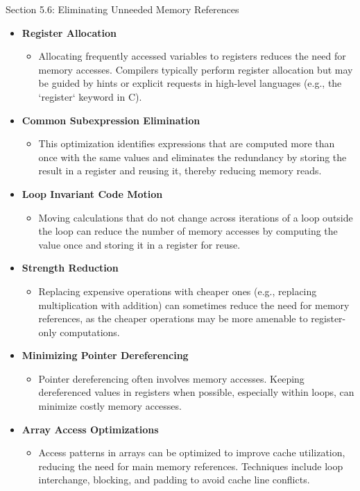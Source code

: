 \begin{notes}{Section 5.6: Eliminating Unneeded Memory References}
    \begin{itemize}
        \item \textbf{Register Allocation}
        \begin{itemize}
            \item Allocating frequently accessed variables to registers reduces the need for memory accesses. Compilers typically perform register allocation but may be guided by hints or explicit 
            requests in high-level languages (e.g., the `register` keyword in C).
        \end{itemize}
        \item \textbf{Common Subexpression Elimination}
        \begin{itemize}
            \item This optimization identifies expressions that are computed more than once with the same values and eliminates the redundancy by storing the result in a register and reusing it, thereby 
            reducing memory reads.
        \end{itemize}
        \item \textbf{Loop Invariant Code Motion}
        \begin{itemize}
            \item Moving calculations that do not change across iterations of a loop outside the loop can reduce the number of memory accesses by computing the value once and storing it in a register 
            for reuse.
        \end{itemize}
        \item \textbf{Strength Reduction}
        \begin{itemize}
            \item Replacing expensive operations with cheaper ones (e.g., replacing multiplication with addition) can sometimes reduce the need for memory references, as the cheaper operations may be 
            more amenable to register-only computations.
        \end{itemize}
        \item \textbf{Minimizing Pointer Dereferencing}
        \begin{itemize}
            \item Pointer dereferencing often involves memory accesses. Keeping dereferenced values in registers when possible, especially within loops, can minimize costly memory accesses.
        \end{itemize}
        \item \textbf{Array Access Optimizations}
        \begin{itemize}
            \item Access patterns in arrays can be optimized to improve cache utilization, reducing the need for main memory references. Techniques include loop interchange, blocking, and padding to 
            avoid cache line conflicts.
        \end{itemize}
    \end{itemize}
    

\end{notes}
